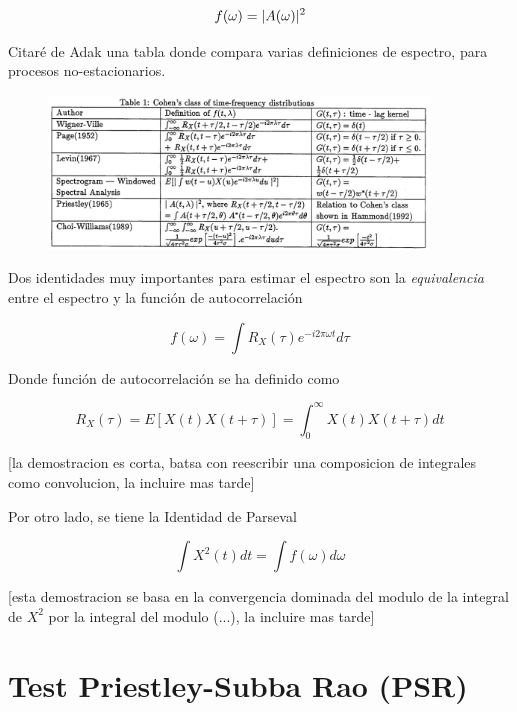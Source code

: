 \begin{equation*}
f(\omega) = \lvert A(\omega) \rvert^{2}
\end{equation*}

Citar\'e de Adak \cite{Adak98} una tabla donde compara varias definiciones de espectro, para
procesos no-estacionarios.

\begin{figure}[h]
\centering
\includegraphics[width=0.9\textwidth]{tabla.png} 
\end{figure}

Dos identidades muy importantes para estimar el espectro son la \textit{equivalencia} entre
el espectro y la funci\'on de autocorrelaci\'on

\begin{equation*}
f(\omega ) = \int R_X(\tau ) e^{-i 2\pi \omega t} d\tau
\end{equation*}

Donde funci\'on de autocorrelaci\'on se ha definido como

\begin{equation*}
R_X(\tau) = E\left[ X(t) X(t+\tau) \right] = \int_0^{\infty} X(t)X(t+\tau) dt
\end{equation*}

[la demostracion es corta, batsa con reescribir una composicion de integrales como convolucion,
la incluire mas tarde]

Por otro lado, se tiene la Identidad de Parseval

\begin{equation*}
\int X^{2}(t) dt = \int f(\omega) d\omega
\end{equation*}

[esta demostracion se basa en la convergencia dominada del modulo de la integral de $X^{2}$ por
la integral del modulo (...), la incluire mas tarde]


\section{Test Priestley-Subba Rao (PSR)}

